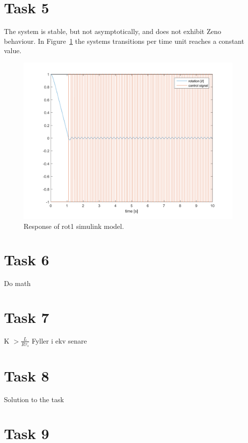 \documentclass[a4paper,12pt,oneside,onecolumn]{article} %
\begin{document}
\section*{Task 5}

	The system is stable, but not asymptotically, and does not exhibit Zeno behaviour. In Figure~\ref{fig:task5_plot} the systems transitions per time unit reaches a constant value.
	\begin{figure}[H]
        \centering
        \includegraphics[width=1\linewidth]{../matlab/images/task5_plot.png}
        \caption{Response of rot1 simulink model.}
        \label{fig:task5_plot}
    \end{figure}

\section*{Task 6}

Do math

\section*{Task 7}

K  $ >\frac{L}{ {R\tau}_s}$ 
Fyller i ekv senare

\section*{Task 8}

Solution to the task

\section*{Task 9}
\end{document}
